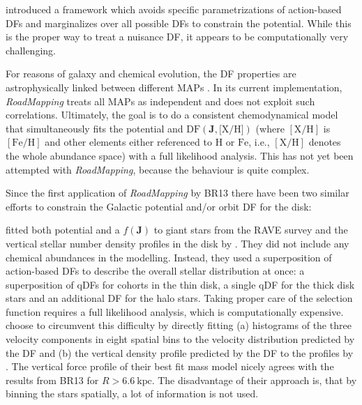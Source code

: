 \documentclass[iop,revtex4,numberedappendix,appendixfloats]{emulateapj}
\newcommand{\vect}[1]{\boldsymbol{#1}}
\newcommand{\MAPs}{MAPs}
\newcommand{\RM}{{\sl RoadMapping}}
\begin{document}
\citet{2014MNRAS.437.2230M} introduced a framework which avoids specific parametrizations of action-based DFs and marginalizes over all possible DFs to constrain the potential. While this is the proper way to treat a nuisance DF, it appears to be computationally very challenging.

For reasons of galaxy and chemical evolution, the DF properties are astrophysically linked between different \MAPs{} \citep{2015MNRAS.449.3479S}. In its current implementation, \RM{} treats all \MAPs{} as independent and does not exploit such correlations. Ultimately, the goal is to do a consistent chemodynamical model that simultaneously fits the potential and $\text{DF}(\vect{J},\text{[X/H]})$ (where $[\mathrm{X}/\mathrm{H}]$ is $[\mathrm{Fe}/\mathrm{H}]$ and other elements either referenced to $\mathrm{H}$ or $\mathrm{Fe}$, i.e., $[\mathrm{X}/\mathrm{H}]$ denotes the whole abundance space) with a full likelihood analysis. This has not yet been attempted with \RM{}, because the behaviour is quite complex. 

Since the first application of \RM{} by BR13 there have been two similar efforts to constrain the Galactic potential and/or orbit DF for the disk:

\citet{2014MNRAS.445.3133P} fitted both potential and a $f(\vect{J})$ to giant stars from the RAVE survey \citep{2006AJ....132.1645S} and the vertical stellar number density profiles in the disk by \citet{2008ApJ...673..864J}. They did not include any chemical abundances in the modelling. Instead, they used a superposition of action-based DFs to describe the overall stellar distribution at once: a superposition of qDFs for cohorts in the thin disk, a single qDF for the thick disk stars and an additional DF for the halo stars. Taking proper care of the selection function requires a full likelihood analysis, which is computationally expensive. \citet{2014MNRAS.445.3133P} choose to circumvent this difficulty by directly fitting (a) histograms of the three velocity components in eight spatial bins to the velocity distribution predicted by the DF and (b) the vertical density profile predicted by the DF to the profiles by \citet{2008ApJ...673..864J}. The vertical force profile of their best fit mass model nicely agrees with the results from BR13 for $R>6.6~\text{kpc}$. The disadvantage of their approach is, that by binning the stars spatially, a lot of information is not used.
\end{document}
